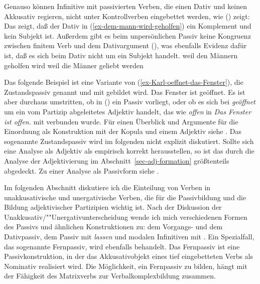 Genauso können Infinitive mit passivierten Verben, die einen Dativ und keinen Akkusativ regieren,
nicht unter Kontrollverben eingebettet werden, wie () zeigt:
\z
Das zeigt, daß der Dativ in (\ref{ex-dem-mann-wird-geholfen}) ein Komplement und kein Subjekt ist.
Außerdem gibt es beim unpersönlichen Passiv keine Kongruenz zwischen finitem Verb und dem Dativargument
(), was ebenfalls Evidenz dafür ist, daß es sich beim Dativ nicht um ein Subjekt
handelt.
\eal
\ex weil den Männern geholfen wird
\ex weil die Männer geliebt werden
\zl


\noindent
Das folgende Beispiel ist eine Variante von (\ref{ex-Karl-oeffnet-das-Fenster}), die Zustandspassiv genannt und mit \sein{} gebildet wird.
\ea 
Das Fenster ist geöffnet.
\z
Es ist aber durchaus umstritten, ob in () ein Passiv vorliegt,
oder ob es sich bei \emph{geöffnet} um ein vom Partizip abgeleitetes Adjektiv handelt, das wie
\emph{offen} in \emph{Das Fenster ist offen.} mit \sein verbunden wurde. Für einen Überblick und Argumente für die
Einordnung als Konstruktion mit der Kopula \sein und einem Adjektiv siehe
. Das sogenannte Zustandspassiv wird im folgenden nicht explizit
diskutiert. Sollte sich eine Analyse als Adjektiv als empirisch korrekt herausstellen, so ist das
durch die Analyse der Adjektivierung im Abschnitt~\ref{sec-adj-formation} größtenteils abgedeckt. Zu einer
Analyse als Passivform siehe .


Im folgenden Abschnitt diskutiere ich die Einteilung von Verben in unakkusativische und unergativische Verben,
die für die Passivbildung und die Bildung adjektivischer Partizipien wichtig ist. 
Nach der Diskussion der Unakkusativ/""Unergativunterscheidung wende ich
mich verschiedenen Formen des Passivs und ähnlichen Konstruktionen zu: dem Vorgangs- und
dem Dativpassiv, dem Passiv mit \emph{lassen} und modalen Infinitiven mit
\sein. Ein Spezialfall, das sogenannte Fernpassiv, wird ebenfalls behandelt. Das Fernpassiv
ist eine Passivkonstruktion, in der das Akkusativobjekt eines tief eingebetteten Verbs als
Nominativ realisiert wird. Die Möglichkeit, ein Fernpassiv zu bilden, hängt mit der Fähigkeit
des Matrixverbs zur Verbalkomplexbildung zusammen.

